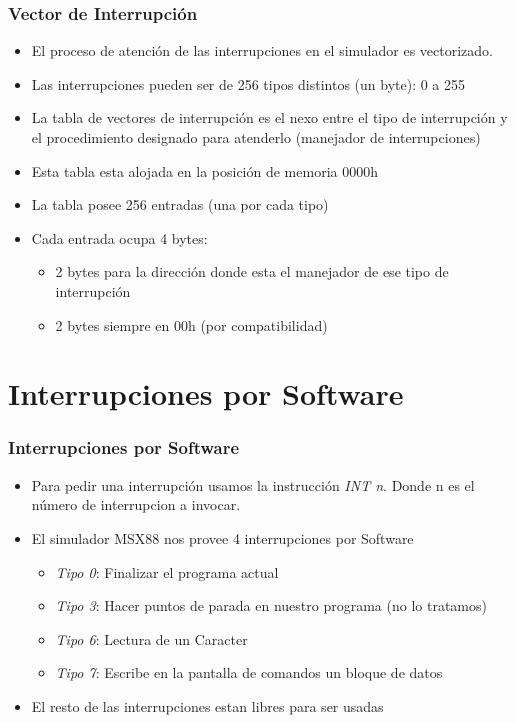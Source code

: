 \documentclass{beamer}
\begin{document}
\begin{frame}
\frametitle{Vector de Interrupción}
\begin{itemize}
  \item El proceso de atención de las interrupciones en el simulador es vectorizado.
  \item Las interrupciones pueden ser de 256 tipos distintos (un byte): 0 a 255
  \item La tabla de vectores de interrupción es el nexo entre el tipo de interrupción y el procedimiento designado para atenderlo (manejador de interrupciones)
  \item Esta tabla esta alojada en la posición de memoria 0000h
  \item La tabla posee 256 entradas (una por cada tipo)
  \item Cada entrada ocupa 4 bytes: 
  \begin {itemize}
  \item 2 bytes para la dirección donde esta el manejador de ese tipo de interrupción 
  \item 2 bytes siempre en 00h (por compatibilidad)
\end{itemize}
\end{itemize}

\end{frame}


\section{Interrupciones por Software}
\begin{frame}
\frametitle{Interrupciones por Software}
\begin{itemize}
 \item Para pedir una interrupción usamos la instrucción \emph{INT n}. Donde n es el número de interrupcion a invocar.
 \item El simulador MSX88 nos provee 4 interrupciones por Software
 \begin{itemize}
   \item \emph{Tipo 0}: Finalizar el programa actual
   \item \emph{Tipo 3}: Hacer puntos de parada en nuestro programa (no lo tratamos)
   \item \emph{Tipo 6}: Lectura de un Caracter
   \item \emph{Tipo 7}: Escribe en la pantalla de comandos un bloque de datos
 \end{itemize}
 \item El resto de las interrupciones estan libres para ser usadas
\end{itemize}
\end{frame}
\end{document}
